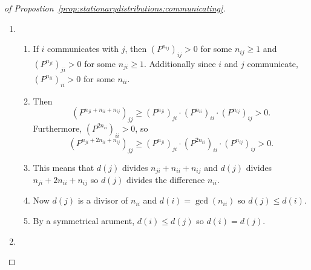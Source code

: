 \documentclass[12pt]{article}
\begin{document}
\begin{proof}[of Propostion~\ref{prop:stationarydistributions:communicating}]
    \begin{enumerate}
        \item
            \begin{enumerate}
                \item
                    If \( i \) communicates with \( j \), then \( (P^{n_
                    {ij}})_{ij} > 0 \) for some \( n_{ij} \ge 1 \) and \(
                    (P^{n_{ji}})_{ji} > 0 \) for some \( n_{ji} \ge 1 \).
                    Additionally since \( i \) and \( j \) communicate, \(
                    (P^{n_{ii}})_{ii} > 0 \) for some \( n_{ii} \).
                \item
                    Then
                    \[
                        (P^{n_{ji} + n_{ii} + n_{ij}})_{jj} \ge (P^{n_{ji}})_
                        {ji} \cdot (P^{n_{ii}})_{ii} \cdot (P^{n_{ij}})_
                        {ij} > 0.
                    \] Furthermore, \( (P^{2n_{ii}})_{ii} > 0 \), so
                    \[
                        (P^{n_{ji} + 2n_{ii} + n_{ij}})_{jj} \ge (P^{n_{ji}})_
                        {ji} \cdot (P^{2n_{ii}})_{ii} \cdot (P^{n_{ij}})_
                        {ij} > 0.
                    \]
                \item
                    This means that \( d(j) \) divides \( n_{ji} + n_{ii}
                    + n_{ij} \) and \( d(j) \) divides \( n_{ji} + 2n_{ii}
                    + n_{ij} \) so \( d(j) \) divides the difference \(
                    n_{ii} \).
                \item
                    Now \( d(j) \) is a divisor of \( n_{ii} \) and \( d
                    (i) = \gcd(n_{ii}) \) so \( d(j) \le d(i) \).
                  \item 
                    By a symmetrical arument, \(d(i) \le d(j) \) so \(
                    d(i) = d(j) \).
            \end{enumerate}
        \item
\end{enumerate}
\end{proof}
\end{document}
